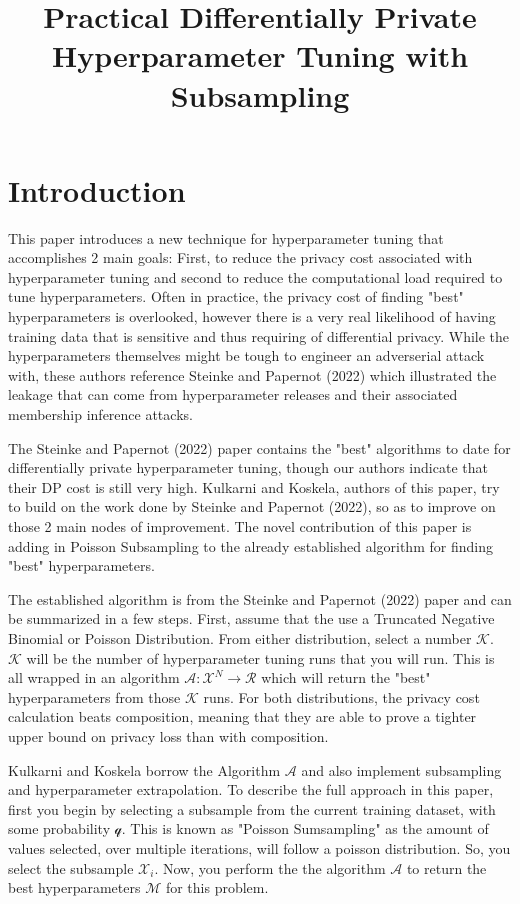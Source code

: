 \documentclass{article}
\title{Practical Differentially Private Hyperparameter Tuning with Subsampling}
\begin{document}
    \maketitle

    \section{Introduction}\label{sec:introduction}
    This paper introduces a new technique for hyperparameter tuning that accomplishes 2 main goals: First, to reduce the privacy cost associated with 
    hyperparameter tuning and second to reduce the computational load required to tune hyperparameters. Often in practice, the privacy cost of finding "best"
    hyperparameters is overlooked, however there is a very real likelihood of having training data that is sensitive and thus requiring of differential privacy.
    While the hyperparameters themselves might be tough to engineer an adverserial attack with, these authors reference Steinke and Papernot (2022) which illustrated
    the leakage that can come from hyperparameter releases and their associated membership inference attacks.

    The Steinke and Papernot (2022) paper contains the "best" algorithms to date for differentially private hyperparameter tuning, though our authors indicate that
    their DP cost is still very high. Kulkarni and Koskela, authors of this paper, try to build on the work done by Steinke and Papernot (2022), so as to improve on
    those 2 main nodes of improvement. The novel contribution of this paper is adding in Poisson Subsampling to the already established algorithm for finding
    "best" hyperparameters.

    The established algorithm is from the Steinke and Papernot (2022) paper and can be summarized in a few steps. First, assume that the use a Truncated Negative Binomial
    or Poisson Distribution. From either distribution, select a number $\mathcal{K}$. $\mathcal{K}$ will be the number of hyperparameter tuning runs that you will run. 
    This is all wrapped in an algorithm $\mathcal{A}: \mathcal{X}^{N} \rightarrow \mathcal{R}$ which will return the "best" hyperparameters from those $\mathcal{K}$ runs.
    For both distributions, the privacy cost calculation beats composition, meaning that they are able to prove a tighter upper bound on privacy loss than with composition. 
    
    Kulkarni and Koskela borrow the Algorithm $\mathcal{A}$ and also implement subsampling and hyperparameter extrapolation. To describe the full approach
    in this paper, first you begin by selecting a subsample from the current training dataset, with some probability $\mathcal{q}$. This is known as "Poisson Sumsampling"
    as the amount of values selected, over multiple iterations, will follow a poisson distribution. So, you select the subsample $\mathcal{X}_i$. Now, you perform the the algorithm
    $\mathcal{A}$ to return the best hyperparameters $\mathcal{M}$ for this problem. 
    
\end{document}
